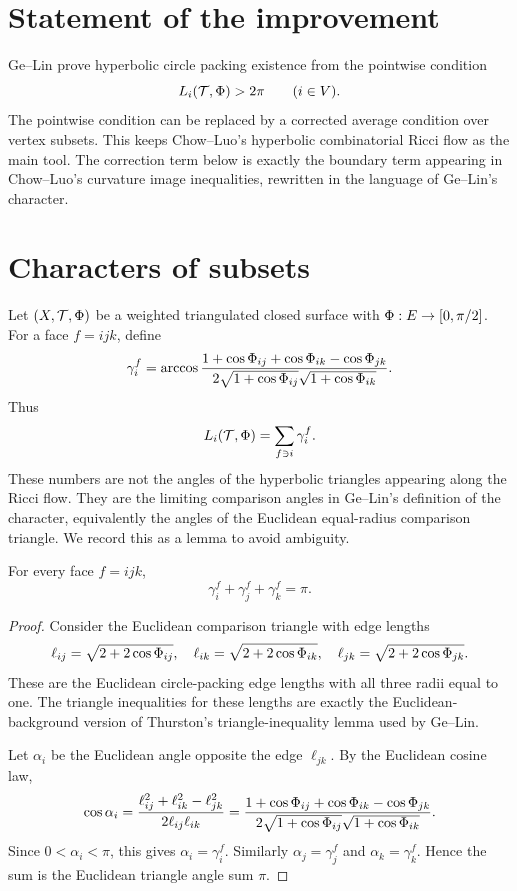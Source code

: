 ﻿\section{Statement of the improvement}

Ge--Lin prove hyperbolic circle packing existence from the pointwise
condition
\[
  L_i(\mathcal T,\Phi)>2\pi \qquad (i\in V).
\]
The pointwise condition can be replaced by a corrected average condition
over vertex subsets.  This keeps Chow--Luo's hyperbolic combinatorial Ricci
flow as the main tool.  The correction term below is exactly the boundary
term appearing in Chow--Luo's curvature image inequalities, rewritten in
the language of Ge--Lin's character.

\section{Characters of subsets}

Let $(X,\mathcal T,\Phi)$ be a weighted triangulated closed surface with
$\Phi:E\to[0,\pi/2]$.  For a face $f=ijk$, define
\[
  \gamma_i^f
  =
  \arccos
  \frac{1+\cos\Phi_{ij}+\cos\Phi_{ik}-\cos\Phi_{jk}}
       {2\sqrt{1+\cos\Phi_{ij}}\sqrt{1+\cos\Phi_{ik}}}.
\]
Thus
\[
  L_i(\mathcal T,\Phi)=\sum_{f\ni i}\gamma_i^f .
\]
These numbers are not the angles of the hyperbolic triangles appearing
along the Ricci flow.  They are the limiting comparison angles in
Ge--Lin's definition of the character, equivalently the angles of the
Euclidean equal-radius comparison triangle.  We record this as a lemma to
avoid ambiguity.

\begin{lemma}\label{lem:comparison-angle}
\leanok
For every face $f=ijk$,
\[
  \gamma_i^f+\gamma_j^f+\gamma_k^f=\pi .
\]
\end{lemma}

\begin{proof}
Consider the Euclidean comparison triangle with edge lengths
\[
  \ell_{ij}=\sqrt{2+2\cos\Phi_{ij}},\quad
  \ell_{ik}=\sqrt{2+2\cos\Phi_{ik}},\quad
  \ell_{jk}=\sqrt{2+2\cos\Phi_{jk}}.
\]
These are the Euclidean circle-packing edge lengths with all three radii
equal to one.  The triangle inequalities for these lengths are exactly the
Euclidean-background version of Thurston's triangle-inequality lemma used
by Ge--Lin.

Let $\alpha_i$ be the Euclidean angle opposite the edge $\ell_{jk}$.
By the Euclidean cosine law,
\[
 \cos \alpha_i
 =
 \frac{\ell_{ij}^2+\ell_{ik}^2-\ell_{jk}^2}{2\ell_{ij}\ell_{ik}}
 =
 \frac{1+\cos\Phi_{ij}+\cos\Phi_{ik}-\cos\Phi_{jk}}
      {2\sqrt{1+\cos\Phi_{ij}}\sqrt{1+\cos\Phi_{ik}}}.
\]
Since $0<\alpha_i<\pi$, this gives $\alpha_i=\gamma_i^f$.  Similarly
$\alpha_j=\gamma_j^f$ and $\alpha_k=\gamma_k^f$.  Hence the sum is the
Euclidean triangle angle sum $\pi$.
\end{proof}

